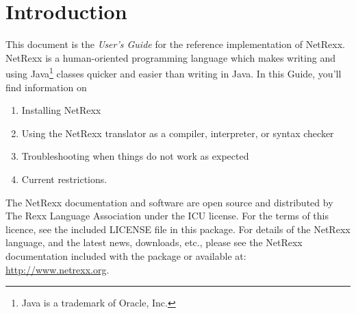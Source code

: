 \chapter{Introduction}
This document is the \emph{User’s Guide} for the reference implementation of
NetRexx. NetRexx is a human-oriented programming language which makes
writing and using Java\footnote{Java is a trademark of Oracle, Inc.} classes quicker and easier than writing in Java. 
In this Guide, you’ll find information on
\begin{enumerate} 
\item Installing NetRexx 
\item Using the NetRexx translator as a compiler, interpreter, or
  syntax checker 
\item Troubleshooting when things do not work as expected
\item Current restrictions.
\end{enumerate} 
The NetRexx documentation and software are open source and distributed by The Rexx Language Association under the \textsc{ICU} license. For the terms of this licence, see the included \textsc{LICENSE} file in this package.
For details of the NetRexx language, and the latest news, downloads, etc., please see the NetRexx documentation included with the package or available at: \url{http://www.netrexx.org}.
